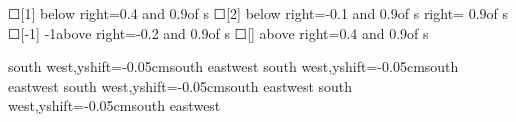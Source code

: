 \begin{scope}[new]
    {☐[1]}
    {}{below right=0.4 and 0.9of s}{}
    {☐[2]}
    {}{below right=-0.1 and 0.9of s}{}
    {}
    {}{right= 0.9of s}{}
    {☐[-1]}
    {-1}{above right=-0.2 and 0.9of s}{}
    {☐[]}
    {}{above right=0.4 and 0.9of s}{}

    {}
    {}{}{south west,yshift=-0.05cm}{south east}{west}
    {\shaftDefinitionSidePortIcon\shaftDefinitionDoorNumberPortIcon}
    {}{}{south west,yshift=-0.05cm}{south east}{west}
    {\shaftDefinitionSidePortIcon\shaftDefinitionDoorNumberPortIcon}
    {}{}{south west,yshift=-0.05cm}{south east}{west}
    {\shaftDefinitionSidePortIcon\shaftDefinitionDoorNumberPortIcon}
    {}{}{south west,yshift=-0.05cm}{south east}{west}
\end{scope}

